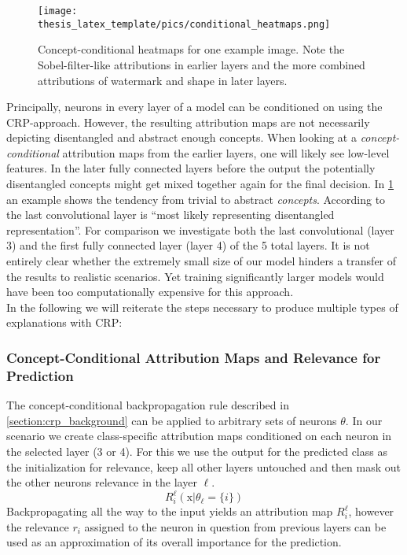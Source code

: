 \begin{figure}
    \centering
    \texttt{[image: thesis\_latex\_template/pics/conditional\_heatmaps.png]}
    \caption{Concept-conditional heatmaps for one example image. Note the Sobel-filter-like attributions in earlier layers and the more combined attributions of watermark and shape in later layers.}
    \label{fig:cc_heatmaps}
\end{figure}

Principally, neurons in every layer of a model can be conditioned on using the CRP-approach. However, the resulting attribution maps are not necessarily depicting disentangled and abstract enough concepts. When looking at a \textit{concept-conditional} attribution maps from the earlier layers, one will likely see low-level features. In the later fully connected layers before the output the potentially disentangled concepts might get mixed together again for the final decision. In \cref{fig:cc_heatmaps} an example shows the tendency from trivial to abstract \textit{concepts}. 
According to \cite{Dreyer2023a, Zeiler2013} the last convolutional layer is ``most likely representing disentangled representation''. For comparison we investigate both the last convolutional (layer 3) and the first fully connected layer (layer 4) of the 5 total layers. It is not entirely clear whether the extremely small size of our model hinders a transfer of the results to realistic scenarios. Yet training significantly larger models would have been too computationally expensive for this approach. \\

In the following we will reiterate the steps necessary to produce multiple types of explanations with CRP:

\subsubsection{Concept-Conditional Attribution Maps and Relevance for Prediction}
The concept-conditional backpropagation rule described in \cref{section:crp_background} can be applied to arbitrary sets of neurons $\theta$. In our scenario we create class-specific attribution maps conditioned on each neuron in the selected layer (3 or 4). For this we use the output for the predicted class as the initialization for relevance, keep all other layers untouched and then mask out the other neurons relevance in the layer $\ell$. 
\begin{equation}
    R_{i}^{\ell}(\mathrm{x} |\theta_{\ell}=\{i\}) 
\end{equation}
Backpropagating all the way to the input yields an attribution map $R_i^{\ell}$, however the relevance $r_i$ assigned to the neuron in question from previous layers can be used as an approximation of its overall importance for the prediction.

